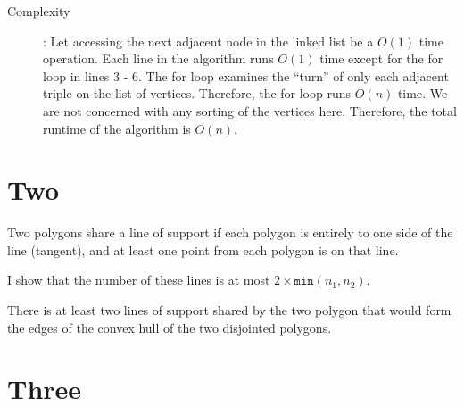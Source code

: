 \documentclass [12pt]{article}
\begin{document}
\begin{enumerate}[label=(\alph*)]
\begin{description}
                \item[Complexity]: Let accessing the next adjacent node in the linked list be a $O(1)$ time operation. Each line in the algorithm runs $O(1)$ time except for the for loop in lines 3 - 6. The for loop examines the ``turn'' of only each adjacent triple on the list of vertices. Therefore, the for loop runs $O(n)$ time. We are not concerned with any sorting of the vertices here. Therefore, the total runtime of the algorithm is $O(n)$.
            \end{description}

        \end{enumerate}

    \pagebreak



    \section{Two}
    \label{sec:two}

    Two polygons share a line of support if each polygon is entirely to one side of the line (tangent), and at least one point from each polygon is on that line.

    I show that the number of these lines is at most $2 \times \texttt{min}(n_1, n_2)$. 

    There is at least two lines of support shared by the two polygon that would form the edges of the convex hull of the two disjointed polygons. 


    \pagebreak


    \section{Three}
    \label{sec:three}


    \pagebreak
\end{document}
